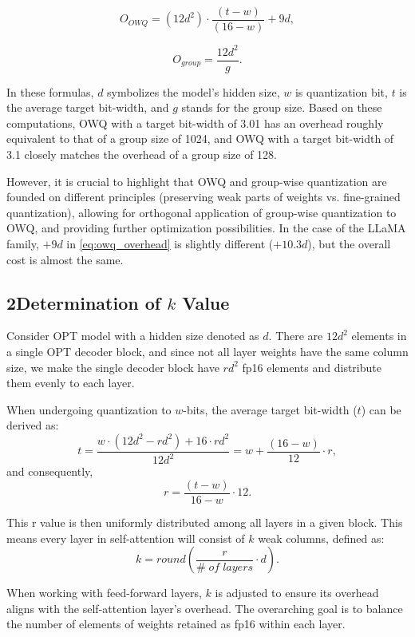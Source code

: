 \documentclass[letterpaper]{article} %
\begin{document}
\begin{equation}
O_{OWQ} = (12d^2) \cdot \frac{(t-w)}{(16-w)} + 9d, 
\label{eq:owq_overhead}
\end{equation}

\begin{equation}
O_{group} = \frac{12d^2}{g}.
\label{eq:group_overhead}
\end{equation}

In these formulas, $d$ symbolizes the model's hidden size, $w$ is quantization bit, $t$ is the average target bit-width, and $g$ stands for the group size. Based on these computations, OWQ with a target bit-width of 3.01 has an overhead roughly equivalent to that of a group size of 1024, and OWQ with a target bit-width of 3.1 closely matches the overhead of a group size of 128.

However, it is crucial to highlight that OWQ and group-wise quantization are founded on different principles (preserving weak parts of weights vs. fine-grained quantization), allowing for orthogonal application of group-wise quantization to OWQ, and providing further optimization possibilities. In the case of the LLaMA family, $+ 9d$ in \cref{eq:owq_overhead} is slightly different ($+ 10.3d$), but the overall cost is almost the same.

\subsection*{2\quad Determination of \( k \) Value}

Consider OPT model with a hidden size denoted as \( d \).
There are \( 12d^2 \) elements in a single OPT decoder block, and since not all layer weights have the same column size, we make the single decoder block have \( rd^2 \) fp16 elements and distribute them evenly to each layer.

When undergoing quantization to \( w \)-bits, the average target bit-width ($t$) can be derived as:
\[
t = \frac{w \cdot (12d^2 - rd^2) + 16 \cdot rd^2}{12d^2} = w + \frac{(16-w)}{12} \cdot r, 
\]
and consequently,
\[
r = \frac{(t-w)}{16-w} \cdot 12.
\]

This r value is then uniformly distributed among all layers in a given block. This means every layer in self-attention will consist of \( k \) weak columns, defined as:
\[
k = round\left(\frac{r}{\# \; of \; layers} \cdot d\right).
\]

When working with feed-forward layers, \( k \) is adjusted to ensure its overhead aligns with the self-attention layer's overhead. The overarching goal is to balance the number of elements of weights retained as fp16 within each layer.
\end{document}
